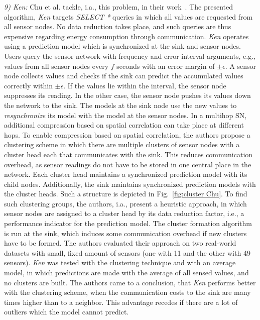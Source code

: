 \par
\textit{9) Ken:}
Chu et al. tackle, i.a., this problem, in their work~\cite{chu2006approximate}.
The presented algorithm, \textit{Ken} targets \textit{SELECT *} queries in
which all values are requested from all sensor nodes. No data reduction takes
place, and such queries are thus expensive regarding energy consumption through
communication. \textit{Ken} operates using a prediction model which is
synchronized at the sink and sensor nodes. Users query the sensor network with
frequency and error interval arguments, e.g., values from all sensor nodes
every $ f $ seconds with an error margin of $ \pm\epsilon $. A sensor node
collects values and checks if the sink can predict the accumulated values
correctly within $ \pm\epsilon $. If the values lie within the interval, the
sensor node suppresses its reading. In the other case, the sensor node pushes
its values down the network to the sink. The models at the sink node use the
new values to \textit{resynchronize} its model with the model at the sensor
nodes. In a multihop \ac{SN}, additional compression based on spatial
correlation can take place at different hops. To enable compression based on
spatial correlation, the authors propose a clustering scheme in which there are
multiple clusters of sensor nodes with a cluster head each that communicates
with the sink. This reduces communication overhead, as sensor readings do not
have to be stored in one central place in the network. Each cluster head
maintains a synchronized prediction model with its child nodes. Additionally,
the sink maintains synchronized prediction models with the cluster heads. Such
a structure is depicted in Fig.~\ref{fig:cluster Chu}. To find such clustering
groups, the authors, i.a., present a heuristic approach, in which sensor nodes
are assigned to a cluster head by its data reduction factor, i.e., a
performance indicator for the prediction model. The cluster formation algorithm
is run at the sink, which induces some communication overhead if new clusters
have to be formed. The authors evaluated their approach on two real-world
datasets with small, fixed amount of sensors (one with 11 and the other with 49
sensors). \textit{Ken} was tested with the clustering technique and with an
average model, in which predictions are made with the average of all sensed
values, and no clusters are built. The authors came to a conclusion, that
\textit{Ken} performs better with the clustering scheme, when the communication
costs to the sink are many times higher than to a neighbor. This advantage
recedes if there are a lot of outliers which the model cannot predict.

